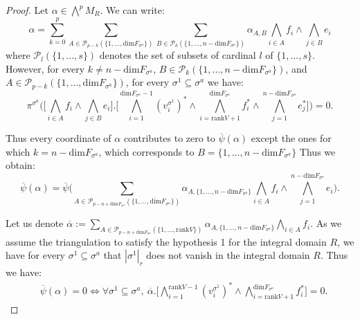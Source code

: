 \documentclass{article}
\begin{document}
\begin{proof}
    Let $\alpha \in \bigwedge^p M_R$. We can write:
    \begin{equation*}
        \alpha = \sum_{k=0}^p\sum_{A \in \mathcal{P}_{p-k}(\{1,...,\mathrm{dim}F_{\sigma^a}\})}\sum_{B \in \mathcal{P}_{k}(\{1,...,n-\mathrm{dim} F_{\sigma^a}\})}\alpha_{A,B} \bigwedge_{i \in A}f_i \wedge\bigwedge_{j\in B} e_i
    \end{equation*}
    where $\mathcal{P}_l(\{1,...,s\})$ denotes the set of subsets of cardinal $l$ of $\{1,...,s\}$. However, for every $k\neq n- \mathrm{dim} F_{\sigma^a}$, $B \in \mathcal{P}_{k}(\{1,...,n-\mathrm{dim} F_{\sigma^a}\})$, and $A \in \mathcal{P}_{p-k}(\{1,...,\mathrm{dim}F_{\sigma^a}\})$, for every $\sigma^1 \subseteq \sigma^a$ we have:
    \begin{equation*}
        \pi^{\sigma^a}\Bigg(\Bigg[\bigwedge_{i \in A}f_i \wedge\bigwedge_{j\in B} e_i \Bigg].\Bigg[\bigwedge_{i=1}^{\mathrm{dim}F_{\sigma^a} -1}(v_i^{\sigma^1})^* \wedge\bigwedge_{i=\mathrm{rank}V+1}^{\mathrm{dim}F_{\sigma^a}}f_i^* \wedge\bigwedge_{j=1}^{n-\mathrm{dim}F_{\sigma^a}}e_j^* \Bigg] \Bigg) = 0.
    \end{equation*}

    Thus every coordinate of $\alpha$ contributes to zero to $\overline{\psi}(\alpha)$ except the ones for which $k=n-\mathrm{dim}F_{\sigma^a}$, which corresponds to $B=\{1,...,n-\mathrm{dim}F_{\sigma^a}\}$ Thus we obtain:
    \begin{equation*}
        \overline{\psi}(\alpha) = \overline{\psi} \Bigg( \sum_{A \in \mathcal{P}_{p-n+\mathrm{dim} F_{\sigma^a}}(\{1,...,\mathrm{dim}F_{\sigma^a}\})}\alpha_{A,\{1,...,n-\mathrm{dim} F_{\sigma^a}\} } \bigwedge_{i \in A}f_i \wedge\bigwedge_{j=1}^{n-\mathrm{dim} F_{\sigma^a}} e_i\Bigg).
    \end{equation*}

    Let us denote $\overline{\alpha}:=\sum_{A \in \mathcal{P}_{p-n+\mathrm{dim} F_{\sigma^a}}(\{1,...,\mathrm{rank}V\})}\alpha_{A,\{1,...,n-\mathrm{dim} F_{\sigma^a}\} } \bigwedge_{i \in A}f_i$. As we assume the triangulation to satisfy the hypothesis 1 for the integral domain $R$, we have for every $\sigma^1 \subseteq \sigma^a$ that $|\sigma^1|_r$ does not vanish in the integral domain $R$. Thus we have:
    \begin{align*}
        &\overline{\psi}(\alpha) = 0 \iff \forall \sigma^1 \subseteq \sigma^a, ~\overline{\alpha}.\Bigg[\bigwedge_{i=1}^{\mathrm{rank}V -1}(v_i^{\sigma^1})^*\wedge\bigwedge_{i=\mathrm{rank}V+1}^{\mathrm{dim}F_{\sigma^a}} f_i^*\Bigg] =0.
    \end{align*}


\end{proof}
\end{document}
